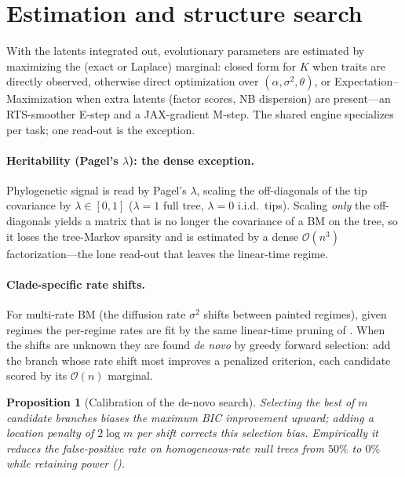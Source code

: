 \documentclass[11pt]{article}
\newtheorem{proposition}{Proposition}
\newcommand{\bigO}{\mathcal{O}}
\begin{document}
\section{Estimation and structure search}
\label{sec:estimation}

With the latents integrated out, evolutionary parameters are estimated by maximizing the
(exact or Laplace) marginal: closed form for $K$ when traits are directly observed, otherwise
direct optimization over $(\alpha,\sigma^2,\theta)$, or Expectation--Maximization when extra
latents (factor scores, NB dispersion) are present---an RTS-smoother E-step and a JAX-gradient
M-step. The shared engine specializes per task; one read-out is the exception.

\paragraph{Heritability (Pagel's $\lambda$): the dense exception.} Phylogenetic signal is read
by Pagel's $\lambda$, scaling the off-diagonals of the tip covariance by $\lambda\in[0,1]$
($\lambda{=}1$ full tree, $\lambda{=}0$ i.i.d.\ tips). Scaling \emph{only} the off-diagonals
yields a matrix that is no longer the covariance of a BM on the tree, so it loses the
tree-Markov sparsity and is estimated by a dense $\bigO(n^3)$ factorization---the lone
read-out that leaves the linear-time regime.

\paragraph{Clade-specific rate shifts.} For multi-rate BM (the diffusion rate $\sigma^2$ shifts
between painted regimes), given regimes the per-regime rates are fit by the same linear-time
pruning of . When the shifts are unknown they are found \emph{de novo} by
greedy forward selection: add the branch whose rate shift most improves a penalized criterion,
each candidate scored by its $\bigO(n)$ marginal.

\begin{proposition}[Calibration of the de-novo search]
\label{prop:calibration}
Selecting the best of $m$ candidate branches biases the maximum BIC improvement upward; adding
a location penalty of $2\log m$ per shift corrects this selection bias. Empirically it reduces
the false-positive rate on homogeneous-rate null trees from $50\%$ to $0\%$ while retaining
power ().
\end{proposition}
\end{document}

